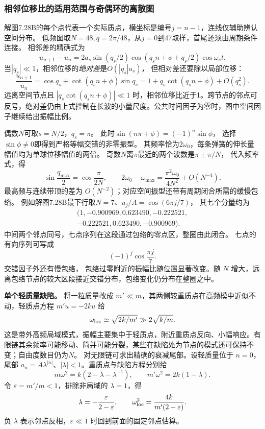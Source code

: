 \documentclass[UTF8,fontset=fandol,a4paper,11pt]{ctexart}
\begin{document}
\subsubsection*{相邻位移比的适用范围与奇偶环的离散图}
解图7.28B的每个点代表一个实际质点，横坐标是编号$j=n-1$，连线仅辅助辨认空间分布。
低频图取$N=48,q=2\pi/48$，从$j=0$到47取样，首尾还须由周期条件连接。
相邻差的精确式为
\[
u_{n+1}-u_n=2a_s\sin(q_s/2)
\cos(q_sn+\phi+q_s/2)\cos\omega_st.
\]
当$|q_s|\ll1$，相邻位移的\emph{绝对差}是$O(|q_s|a_s)$，
但相对差还要除以局部位移：
\[
\frac{u_{n+1}}{u_n}=\cos q_s+\cot(q_sn+\phi)\sin q_s
=1+q_s\cot(q_sn+\phi)+O(q_s^2).
\]
远离空间节点且 $|q_s\cot(q_sn+\phi)|\ll1$ 时，相邻位移比近于1。跨节点的邻点可反号，绝对差仍由上式控制在长波的小量尺度。公共时间因子为零时，图中空间因子继续给出振幅比例。

偶数$N$可取$s=N/2$，$q_s=\pi$。
此时$\sin(n\pi+\phi)=(-1)^n\sin\phi$，
选择$\sin\phi\ne0$即得到严格等幅交错的非零振型。
其频率恰为$2\omega_0$，每条弹簧的伸长量幅值均为单球位移幅值的两倍。
奇数$N$离$\pi$最近的两个波数是$\pi\pm\pi/N$，
代入频率式，得
\[
\sin\frac{q_{\max}}2=\cos\frac\pi{2N},\qquad
2\omega_0-\omega_{\max}=\frac{\pi^2\omega_0}{4N^2}+O(N^{-4}).
\]
最高频与连续带顶的差为 $O(N^{-2})$；对应空间振型还带有周期闭合所需的缓慢包络。
例如解图7.28B最下行取$N=7$、$u_j/A=\cos(6\pi j/7)$，
其七个分量约为
\[
\begin{gathered}
(1,-0.900969,0.623490,-0.222521,\\
-0.222521,0.623490,-0.900969).
\end{gathered}
\]
中间两个邻点同号，七点序列在这段通过包络的零点区，整圈由此闭合。
七点的有向序列可写成
\[
(-1)^j\cos\frac{\pi j}{7}.
\]
交错因子外还有慢包络，
包络过零附近的振幅比随位置显著改变。随 $N$ 增大，远离包络节点的较大区段接近交错分布，包络变化仍分布在整圈之中。

\par\textbf{单个轻质量缺陷。} 将一粒质量改成 $m'\ll m$，其两侧较重质点在高频模中近似不动，轻质点方程 $m'\ddot u=-2ku$ 给
\[\omega_{
\rm loc}\simeq\sqrt{2k/m'}\gg2\sqrt{k/m}.\]
这是带外高频局域模式，振幅主要集中于轻质点，附近重质点反向、小幅响应。有限链其余频率可能移动、简并可能分裂，某些在缺陷处为节点的模式还可保持不变；自由度数目仍为$N$。
对无限链可求出精确的衰减尾部。设轻质量位于 $n=0$，尾部 $a_n=A\lambda^{|n|}$、$|\lambda|<1$。重质点与缺陷方程分别给
\[m\omega^2=k(2-\lambda-\lambda^{-1}),\qquad
m'\omega^2=2k(1-\lambda).\]
令 $\varepsilon=m'/m<1$，排除非局域的 $\lambda=1$，得
\[\lambda=-\frac{\varepsilon}{2-\varepsilon},\qquad
\omega_{
\rm loc}^2=\frac{4k}{m'(2-\varepsilon)}.\]
负 $\lambda$ 表示邻点反相，$\varepsilon\ll1$ 时回到前面的固定邻点估算。
\end{document}

